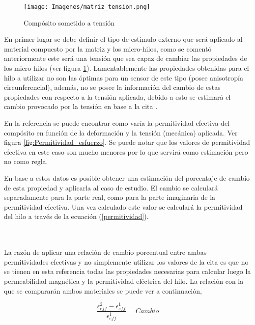 \documentclass[12pt,letterpaper]{article}
\numberwithin{equation}{section}
\begin{document}
\begin{minipage}{0.5\linewidth}
	\begin{figure}[H]
		\centering\texttt{[image: Imagenes/matriz\_tension.png]}\\
		\caption{Compósito sometido a tensión}
		\label{fig:matriz_tension}
	\end{figure}
\end{minipage}
\begin{minipage}{0.5\linewidth}
	En primer lugar se debe definir el tipo de estímulo externo que será aplicado al material compuesto por la matriz y los micro-hilos, como se comentó anteriormente este será una tensión que sea capaz de cambiar las propiedades de los micro-hilos (ver figura \ref{fig:matriz_tension}). Lamentablemente las propiedades obtenidas para el hilo a utilizar no son las óptimas para un sensor de este tipo (posee anisotropía circunferencial), además, no se posee la información del cambio de estas propiedades con respecto a la tensión aplicada, debido a esto se estimará el cambio provocado por la tensión en base a la cita \cite{Wire_backgound}.
	
	En la referencia \cite{Wire_backgound} se puede encontrar como varía la permitividad efectiva del compósito en función de la deformación y la tensión (mecánica) aplicada. Ver figura \ref{fig:Permitividad_esfuerzo}. Se puede notar que los valores de permitividad efectiva en este caso son mucho menores por lo que servirá como estimación pero no como regla. 
	
	En base a estos datos es posible obtener una estimación del porcentaje de cambio de esta propiedad y aplicarla al caso de estudio. El cambio se calculará separadamente para la parte real, como para la parte imaginaria de la permitividad efectiva. Una vez calculado este valor se calculará la permitividad del hilo a través de la ecuación (\ref{permitividad}).
\end{minipage}\\\\

La razón de aplicar una relación de cambio porcentual entre ambas permitividades efectivas y no simplemente utilizar los valores de la cita \cite{Wire_backgound} es que no se tienen en esta referencia todas las propiedades necesarias para calcular luego la permeabilidad magnética y la permitividad eléctrica del hilo. La relación con la que se compararán ambos materiales se puede ver a continuación,

$$\frac{\epsilon^2_{eff}-\epsilon^1_{eff}}{\epsilon^1_{eff}} = Cambio$$
\end{document}
